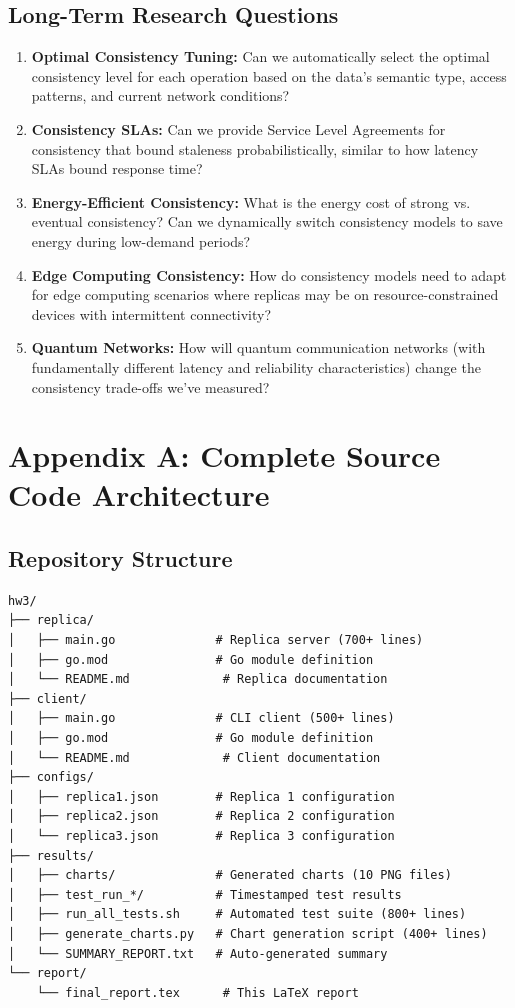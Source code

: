 \documentclass[10pt,a4paper]{article}
\begin{document}
\subsection{Long-Term Research Questions}

\begin{enumerate}
    \item \textbf{Optimal Consistency Tuning:} Can we automatically select the optimal consistency level for each operation based on the data's semantic type, access patterns, and current network conditions?
    
    \item \textbf{Consistency SLAs:} Can we provide Service Level Agreements for consistency that bound staleness probabilistically, similar to how latency SLAs bound response time?
    
    \item \textbf{Energy-Efficient Consistency:} What is the energy cost of strong vs. eventual consistency? Can we dynamically switch consistency models to save energy during low-demand periods?
    
    \item \textbf{Edge Computing Consistency:} How do consistency models need to adapt for edge computing scenarios where replicas may be on resource-constrained devices with intermittent connectivity?
    
    \item \textbf{Quantum Networks:} How will quantum communication networks (with fundamentally different latency and reliability characteristics) change the consistency trade-offs we've measured?
\end{enumerate}

\newpage

\appendix
\section{Appendix A: Complete Source Code Architecture}

\subsection{Repository Structure}

\begin{verbatim}
hw3/
├── replica/
│   ├── main.go              # Replica server (700+ lines)
│   ├── go.mod               # Go module definition
│   └── README.md             # Replica documentation
├── client/
│   ├── main.go              # CLI client (500+ lines)
│   ├── go.mod               # Go module definition
│   └── README.md             # Client documentation
├── configs/
│   ├── replica1.json        # Replica 1 configuration
│   ├── replica2.json        # Replica 2 configuration
│   └── replica3.json        # Replica 3 configuration
├── results/
│   ├── charts/              # Generated charts (10 PNG files)
│   ├── test_run_*/          # Timestamped test results
│   ├── run_all_tests.sh     # Automated test suite (800+ lines)
│   ├── generate_charts.py   # Chart generation script (400+ lines)
│   └── SUMMARY_REPORT.txt   # Auto-generated summary
└── report/
    └── final_report.tex      # This LaTeX report
\end{verbatim}
\end{document}
